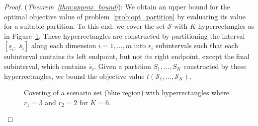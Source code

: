 \documentclass{article}
\newcommand{\mS}{\mathcal{S}}
\begin{document}
\begin{proof}
(\emph{Theorem~\ref{thm:approx_bound}}):
We obtain an upper bound for the optimal objective value of problem~\eqref{prob:opt_partition} by evaluating its value for a suitable partition.
To this end, we cover the set \(\mS\) with \(K\) hyperrectangles as in Figure~\ref{fig:set_partition}.
These hyperrectangles are constructed by partitioning the interval \([\underline{s}_i,\; \overline{s}_i]\) along each dimension \(i=1,\ldots,m\) into \(r_i\) subintervals such that each subinterval contains its left endpoint, but not its right endpoint, except the final subinterval, which contains \(\overline{s}_i\).
Given a partition \(S_1,\dots,S_K\) constructed by these hyperrectangles, we bound the objective value \(t(\mS_1,\dots,\mS_K)\).
\begin{figure}[htb]
	\centering
	\caption{\label{fig:set_partition}Covering of a scenario set (blue region) with hyperrectangles where \(r_1 = 3\) and \(r_2 = 2\) for \(K = 6\).}
\end{figure}
	

\end{proof}
\end{document}
